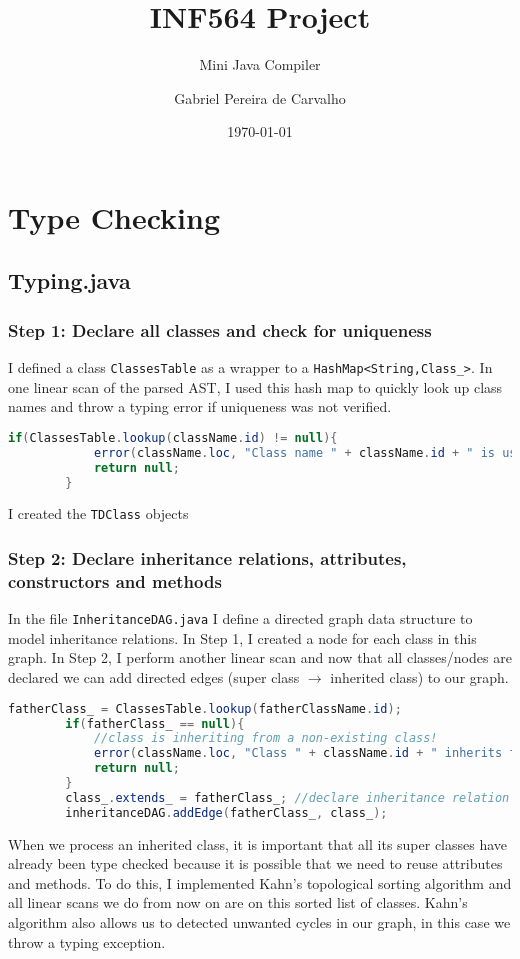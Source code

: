 \documentclass[a4paper,12pt,twoside]{article}
\title{INF564 Project}
\subtitle{Mini Java Compiler}
\author{Gabriel Pereira de Carvalho}
\date{\today}
\begin{document}
	
	\maketitle
	
	\tableofcontents
	
	\newpage
	
	\section{Type Checking}
	
	\subsection{Typing.java}
	
	\subsubsection{Step 1: Declare all classes and check for uniqueness}
	
	I defined a class \texttt{ClassesTable} as a wrapper to a \texttt{HashMap<String,Class\_>}. In one linear scan of the parsed AST, I used this hash map to quickly look up class names and throw a typing error if uniqueness was not verified.
	\begin{lstlisting}[language=Java]
		if(ClassesTable.lookup(className.id) != null){
			error(className.loc, "Class name " + className.id + " is used for more than one class");
			return null;
		}
	\end{lstlisting}
	
	 I created the \texttt{TDClass} objects
	
	\subsubsection{Step 2: Declare inheritance relations, attributes, constructors and methods}
	
	In the file \texttt{InheritanceDAG.java} I define a directed graph data structure to model inheritance relations. In Step 1, I created a node for each class in this graph. In Step 2, I perform another linear scan and now that all classes/nodes are declared we can add directed edges (super class $\to$ inherited class) to our graph.
	\begin{lstlisting}[language=Java]
		fatherClass_ = ClassesTable.lookup(fatherClassName.id);
		if(fatherClass_ == null){
			//class is inheriting from a non-existing class!
			error(className.loc, "Class " + className.id + " inherits from non-existing class " + fatherClassName.id);
			return null;
		}
		class_.extends_ = fatherClass_; //declare inheritance relation (TDclass in linked list should point to this updated object)
		inheritanceDAG.addEdge(fatherClass_, class_);
	\end{lstlisting}
	When we process an inherited class, it is important that all its super classes have already been type checked because it is possible that we need to reuse attributes and methods. To do this, I implemented Kahn's topological sorting algorithm and all linear scans we do from now on are on this sorted list of classes. Kahn's algorithm also allows us to detected unwanted cycles in our graph, in this case we throw a typing exception.
	
\end{document}
